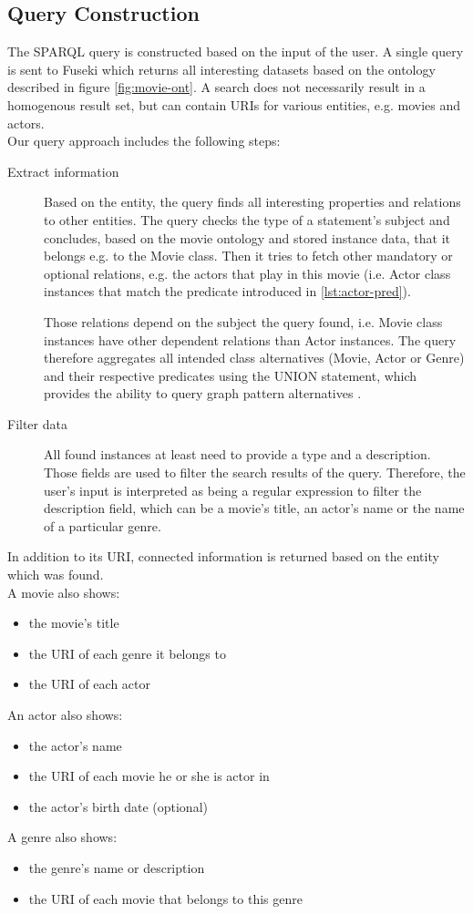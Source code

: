 \subsection{Query Construction}
The SPARQL query is constructed based on the input of the user. A single query is sent to Fuseki which returns all interesting datasets based on the ontology described in figure \ref{fig:movie-ont}. A search does not necessarily result in a homogenous result set, but can contain URIs for various entities, e.g. movies and actors.\\
Our query approach includes the following steps:
\begin{description}  
\item[Extract information]
Based on the entity, the query finds all interesting properties and relations to other entities. The query checks the type of a statement's subject and concludes, based on the movie ontology and stored instance data, that it belongs e.g. to the Movie class. Then it tries to fetch other mandatory or optional relations, e.g. the actors that play in this movie (i.e. Actor class instances that match the predicate introduced in \ref{lst:actor-pred}).

Those relations depend on the subject the query found, i.e. Movie class instances have other dependent relations than Actor instances. The query therefore aggregates all intended class alternatives (Movie, Actor or Genre) and their respective predicates using the UNION statement, which provides the ability to query graph pattern alternatives \cite{w3c:sparql}.
\item[Filter data]
All found instances at least need to provide a type and a description. Those fields are used to filter the search results of the query. Therefore, the user's input is interpreted as being a regular expression to filter the description field, which can be a movie's title, an actor's name or the name of a particular genre.
\end{description}

In addition to its URI, connected information is returned based on the entity which was found.\\
A movie also shows:
\begin{itemize}
\item the movie's title
\item the URI of each genre it belongs to
\item the URI of each actor
\end{itemize}
An actor also shows:
\begin{itemize}
\item the actor's name
\item the URI of each movie he or she is actor in
\item the actor's birth date (optional)
\end{itemize}
A genre also shows:
\begin{itemize}
\item the genre's name or description
\item the URI of each movie that belongs to this genre
\end{itemize}

